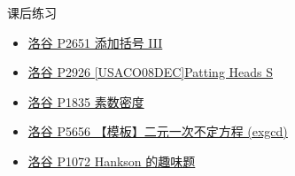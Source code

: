 \begin{frame}[fragile]{课后练习}
	\begin{itemize}
		\item \href{https://www.luogu.com.cn/problem/P2651}{洛谷 P2651 添加括号 III}
		\item \href{https://www.luogu.com.cn/problem/P2926}{洛谷 P2926 [USACO08DEC]Patting Heads S}
		\item \href{https://www.luogu.com.cn/problem/P1835}{洛谷 P1835 素数密度}
		\item \href{https://www.luogu.com.cn/problem/P5656}{洛谷 P5656 【模板】二元一次不定方程 (exgcd)}
		\item \href{https://www.luogu.com.cn/problem/P1072}{洛谷 P1072 Hankson 的趣味题}
	\end{itemize}
\end{frame}
